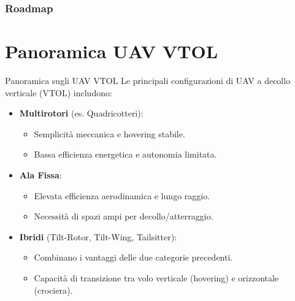 \documentclass[aspectratio=169]{beamer}
\begin{document}
\frame{\titlepage}

\begin{frame}
\frametitle{Roadmap}
\tableofcontents
\end{frame}


\section{Panoramica UAV VTOL}

\begin{frame}{Panoramica sugli UAV VTOL}
    Le principali configurazioni di UAV a decollo verticale (VTOL) includono:
    \begin{itemize}
        \item \textbf{Multirotori} (es. Quadricotteri):
        \begin{itemize}
            \item Semplicità meccanica e hovering stabile.
            \item Bassa efficienza energetica e autonomia limitata.
        \end{itemize}
        \item \textbf{Ala Fissa}:
        \begin{itemize}
            \item Elevata efficienza aerodinamica e lungo raggio.
            \item Necessità di spazi ampi per decollo/atterraggio.
        \end{itemize}
        \item \textbf{Ibridi} (Tilt-Rotor, Tilt-Wing, Tailsitter):
        \begin{itemize}
            \item Combinano i vantaggi delle due categorie precedenti.
            \item Capacità di transizione tra volo verticale (hovering) e orizzontale (crociera).
        \end{itemize}
    \end{itemize}
\end{frame}
\end{document}
